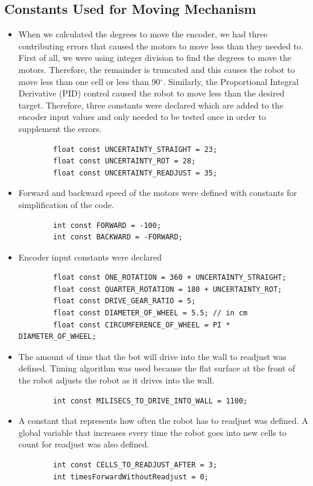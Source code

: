 \documentclass[11pt]{article}
\begin{document}

\subsection{Constants Used for Moving Mechanism}
\begin{itemize}
\item When we calculated the degrees to move the encoder, we had three contributing errors that caused the motors to move less than they needed to. First of all, we were using integer division to find the degrees to move the motors. Therefore, the remainder is truncated and this causes the robot to move less than one cell or less than 90$^{\circ}$. Similarly, the Proportional Integral Derivative (PID) control caused the robot to move less than the desired target. Therefore, three constants were declared which are added to the encoder input values and only needed to be tested once in order to supplement the errors. 
	\begin{verbatim}
		float const UNCERTAINTY_STRAIGHT = 23;
		float const UNCERTAINTY_ROT = 28;
		float const UNCERTAINTY_READJUST = 35;
	\end{verbatim} 
\item Forward and backward speed of the motors were defined with constants for simplification of the code. 
	\begin{verbatim}
		int const FORWARD = -100;
		int const BACKWARD = -FORWARD;
	\end{verbatim} 
\item Encoder input constants were declared
	\begin{verbatim}
		float const ONE_ROTATION = 360 + UNCERTAINTY_STRAIGHT;
		float const QUARTER_ROTATION = 180 + UNCERTAINTY_ROT;
		float const DRIVE_GEAR_RATIO = 5;
		float const DIAMETER_OF_WHEEL = 5.5; // in cm
		float const CIRCUMFERENCE_OF_WHEEL = PI * DIAMETER_OF_WHEEL;
	\end{verbatim} 
\item The amount of time that the bot will drive into the wall to readjust was defined. Timing algorithm was used because the flat surface at the front of the robot adjusts the robot as it drives into the wall.
	\begin{verbatim}
		int const MILISECS_TO_DRIVE_INTO_WALL = 1100;
	\end{verbatim} 
\item A constant that represents how often the robot has to readjust was defined. A global variable that increases every time the robot goes into new cells to count for readjust was also defined.
	\begin{verbatim}
		int const CELLS_TO_READJUST_AFTER = 3;
		int timesForwardWithoutReadjust = 0;
	\end{verbatim}  
\end{itemize}
\newpage
\end{document}
